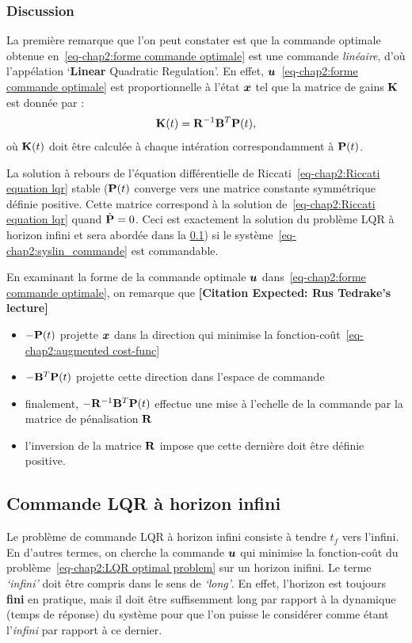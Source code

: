 \subsubsection{Discussion}
La première remarque que l'on peut constater est que la commande optimale obtenue en~\eqref{eq-chap2:forme commande optimale} est une commande \emph{linéaire}, d'où l'appélation ‘\textbf{Linear} Quadratic Regulation’. En effet, $\bm{u}$~\eqref{eq-chap2:forme commande optimale} est proportionnelle à l'état $\bm{x}$ tel que la matrice de gains $\mathbf{K}$ est donnée par :
\begin{equation}
	\mathbf{K}(t) = \mathbf{R}^{-1}\mathbf{B}^T\mathbf{P}(t),
\end{equation}
où $\mathbf{K}(t)$ doit être calculée à chaque intération correspondamment à $\mathbf{P}(t)$. 

La solution à rebours  de l'équation différentielle de Riccati~\eqref{eq-chap2:Riccati equation lqr} stable ($\mathbf{P}(t)$ converge vers une matrice constante symmétrique définie positive. Cette matrice correspond à la solution de~\eqref{eq-chap2:Riccati equation lqr} quand $\boldmath{\dot{\mathbf{P}}}=0$. Ceci est exactement la solution du problème LQR à horizon infini et sera abordée dans la \cref{subsec-chap2:LQR infini}) si le système~\eqref{eq-chap2:syslin_commande} est commandable.

En examinant la forme de la commande optimale $\bm{u}$ dans~\eqref{eq-chap2:forme commande optimale}, on remarque que \textbf{[Citation Expected: Rus Tedrake's lecture]}
\begin{itemize}
	\item $-\mathbf{P}(t)$ projette $\bm{x}$ dans la direction qui minimise la fonction-coût~\eqref{eq-chap2:augmented cost-func}
	\item $-\mathbf{B}^T\mathbf{P}(t)$ projette cette direction dans l'espace de commande
	\item finalement, $-\mathbf{R}^{-1}\mathbf{B}^T\mathbf{P}(t)$ effectue une mise à l'echelle de la commande par la matrice de pénalisation $\mathbf{R}$
	\item l'inversion de la matrice $\mathbf{R}$ impose que cette dernière doit être définie positive.
\end{itemize}
\subsection{Commande LQR à horizon infini}\label{subsec-chap2:LQR infini}
Le problème de commande LQR à horizon infini consiste à tendre $t_f$ vers l'infini. En d'autres termes, on cherche la commande $\bm{u}$ qui minimise la fonction-coût du problème~\eqref{eq-chap2:LQR optimal problem} sur un horizon inifini. Le terme \emph{‘infini’} doit être compris dans le sens de \emph{‘long’}. En effet, l'horizon est toujours \textbf{fini} en pratique, mais il doit être  suffisemment long par rapport à la dynamique (temps de réponse) du système pour que l'on puisse le considérer comme étant l'\emph{infini} par rapport à ce dernier.

